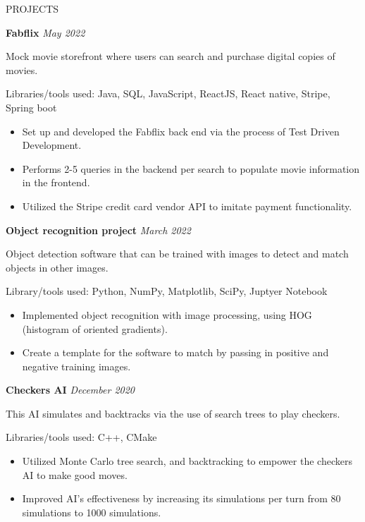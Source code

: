 \documentclass{ResumeFormat} %
\begin{document}
\begin{rSection}{PROJECTS}
\vspace{-2em} %

\item \textbf{Fabflix} {} \hfill {\emph{May 2022}} %

Mock movie storefront where users can search and purchase digital copies of movies.

Libraries/tools used: Java, SQL, JavaScript, ReactJS, React native, Stripe, Spring boot
\begin{itemize}
    \itemsep -3pt {}
     \item Set up and developed the Fabflix back end via the process of Test Driven Development.
     \item Performs 2-5 queries in the backend per search to populate movie information in the frontend.
     \item Utilized the Stripe credit card vendor API to imitate payment functionality.
 \end{itemize}

\item \textbf{Object recognition project} {} \hfill {\emph{March 2022}}

Object detection software that can be trained with images to detect and match objects in other images.

Library/tools used: Python, NumPy, Matplotlib, SciPy, Juptyer Notebook
\begin{itemize}
    \itemsep -3pt {} 
     \item Implemented object recognition with image processing, using HOG (histogram of oriented gradients).
     \item Create a template for the software to match by passing in positive and negative training images.
 \end{itemize}

\item \textbf{Checkers AI} {} \hfill {\emph{December 2020}}

This AI simulates and backtracks via the use of search trees to play checkers.

Libraries/tools used: C++, CMake
\begin{itemize}
    \itemsep -3pt {}
     \item Utilized Monte Carlo tree search, and backtracking to empower the checkers AI to make good moves.
     \item Improved AI's effectiveness by increasing its simulations per turn from 80 simulations to 1000 simulations.
 \end{itemize}


\end{rSection}
\end{document}
